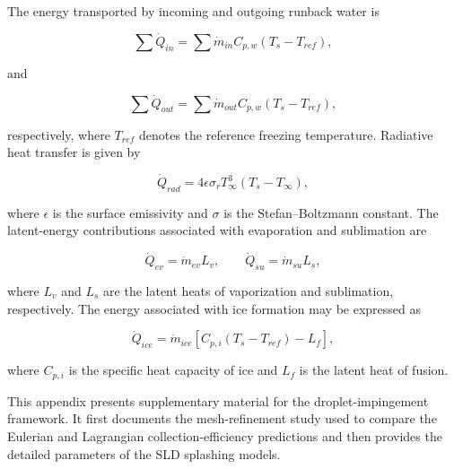 The energy transported by incoming and outgoing runback water is

\begin{equation}
    \sum \dot{Q}_{in}
    =
    \sum \dot{m}_{in} C_{p,w}
    \left(T_s-T_{ref}\right),
    \label{eq:app_qin}
\end{equation}

and

\begin{equation}
    \sum \dot{Q}_{out}
    =
    \sum \dot{m}_{out} C_{p,w}
    \left(T_s-T_{ref}\right),
    \label{eq:app_qout}
\end{equation}

respectively, where $T_{ref}$ denotes the reference freezing temperature. Radiative heat transfer is given by

\begin{equation}
    \dot{Q}_{rad}
    =
    4\epsilon\sigma_r T_\infty^3
    \left(T_s-T_\infty\right),
    \label{eq:app_qrad}
\end{equation}

where $\epsilon$ is the surface emissivity and $\sigma$ is the Stefan--Boltzmann constant. The latent-energy contributions associated with evaporation and sublimation are

\begin{equation}
    \dot{Q}_{ev}
    =
    \dot{m}_{ev} L_v,
    \qquad
    \dot{Q}_{su}
    =
    \dot{m}_{su} L_s,
    \label{eq:app_qevsu}
\end{equation}

where $L_v$ and $L_s$ are the latent heats of vaporization and
sublimation, respectively. The energy associated with ice formation may be expressed as

\begin{equation}
    \dot{Q}_{ice}
    =
    \dot{m}_{ice}
    \left[
        C_{p,i}\left(T_s-T_{ref}\right)-L_f
    \right],
    \label{eq:app_qice}
\end{equation}

where $C_{p,i}$ is the specific heat capacity of ice and $L_f$ is the latent heat of fusion.

\label{app:droplet_models}

This appendix presents supplementary material for the droplet-impingement
framework. It first documents the mesh-refinement study used to compare the
Eulerian and Lagrangian collection-efficiency predictions and then provides
the detailed parameters of the SLD splashing models.

